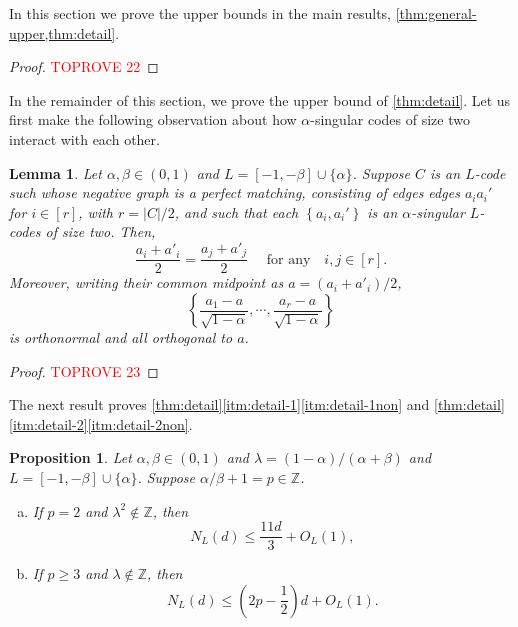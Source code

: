 \documentclass[reqno, 11pt]{amsart}
\newtheorem{proposition}[theorem]{Proposition}
\newtheorem{lemma}[theorem]{Lemma}
\theoremstyle{definition}
\theoremstyle{remark}
\newcommand{\abs}[1]{\left\lvert#1\right\rvert}
\newcommand{\set}[1]{\left\{ #1 \right\}}
\newcommand{\ZZ}{\mathbb{Z}}
\begin{document}
In this section we prove the upper bounds in the main results, \cref{thm:general-upper,thm:detail}. 

\begin{proof}\textcolor{red}{TOPROVE 22}\end{proof}

In the remainder of this section, we prove the upper bound of \cref{thm:detail}. Let us first make the following observation about how $\alpha$-singular codes of size two interact with each other.


\begin{lemma}\label{lem:a-singular-edges} Let $\alpha, \beta \in (0,1)$ and $L = [-1, -\beta] \cup \{\alpha\}$. Suppose $C$ is an $L$-code such whose negative graph is a perfect matching, consisting of edges edges $a_ia_i'$ for $i \in [r]$, with $r = \abs{C}/2$, and such that each $\set{a_i,a_i'}$ is an $\alpha$-singular $L$-codes of size two. Then, 
\[
    \frac{ a_i + a'_i}{2} =  \frac{ a_j + a'_j}{2} \quad \text{ for any} \quad  i, j \in [r].
\]
Moreover, writing their common midpoint as $ a = (a_i + a'_i) / 2$,
\[
    \left\{ \frac{ a_1 -  a}{\sqrt{1-\alpha}}, \cdots,  \frac{ a_r -  a}{\sqrt{1-\alpha}}\right\}
\]
is orthonormal and all orthogonal to $a$.   
\end{lemma}

\begin{proof}\textcolor{red}{TOPROVE 23}\end{proof}

The next result proves \cref{thm:detail}\ref{itm:detail-1}\ref{itm:detail-1non} and \cref{thm:detail}\ref{itm:detail-2}\ref{itm:detail-2non}.

\begin{proposition}\label{prop:algebraic-upper}
    Let $ \alpha, \beta \in (0,1)$ and $\lambda = (1-\alpha)/(\alpha + \beta)$ and $L = [-1, -\beta]\cup\{\alpha\}$. Suppose $\alpha/\beta + 1 = p \in \ZZ$.  
    \begin{enumerate}[(a)]
        \item\label{itm:algebraic-upper-2} If $p = 2$ and $\lambda^2 \notin \ZZ$, then 
        \[
            N_L(d) \leq \frac{11d}{3} + O_L(1),
        \]
        \item\label{itm:algebraic-upper-p} If $p \geq 3$ and $\lambda \notin \ZZ$, then 
        \[
            N_L(d) \leq \left(2p-\frac{1}{2}\right)d + O_L(1).
        \]
    \end{enumerate}
    \end{proposition}
   
\end{document}
